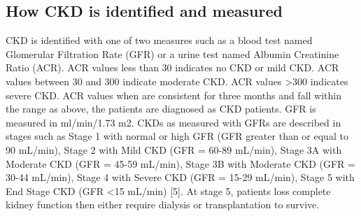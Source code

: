 \subsection{How CKD is identified and measured}
CKD is identified with one of two measures such as a blood test named Glomerular Filtration Rate (GFR) or a urine test named Albumin Creatinine Ratio (ACR).  ACR values less than 30 indicates no CKD or mild CKD. ACR values between 30 and 300 indicate moderate CKD. ACR values \textgreater 300 indicates severe CKD. ACR values when are consistent for three months and fall within the range as above, the patients are diagnosed as CKD patients. GFR is measured in ml/min/1.73 m2. CKDs as measured with GFRs are described in stages such as Stage 1 with normal or high GFR (GFR greater than or equal to 90 mL/min), Stage 2 with Mild CKD (GFR = 60-89 mL/min), Stage 3A with Moderate CKD (GFR = 45-59 mL/min), Stage 3B with Moderate CKD (GFR = 30-44 mL/min), Stage 4 with Severe CKD (GFR = 15-29 mL/min), Stage 5 with End Stage CKD (GFR \textless  15 mL/min) [5]. At stage 5, patients loss complete kidney function then either require dialysis or transplantation to survive.